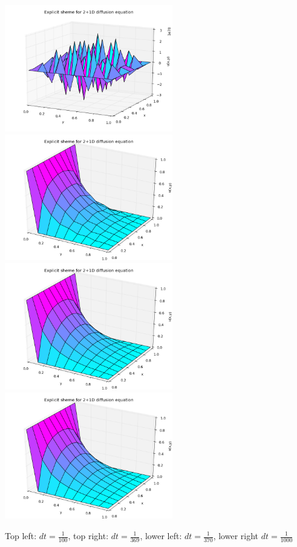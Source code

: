 \documentclass[a4paper, 12pt, titlepage]{article}
\newcommand{\f}[2]{\frac{#1}{#2}}
\begin{document}
\begin{section}
\begin{subsection}
    \includegraphics[width=0.55\textwidth]{build-main-Desktop-Debug/Explicit100.png}
    \includegraphics[width=0.55\textwidth]{build-main-Desktop-Debug/Explicit369.png}
    \includegraphics[width=0.55\textwidth]{build-main-Desktop-Debug/Explicit370.png}
    \includegraphics[width=0.55\textwidth]{build-main-Desktop-Debug/Explicit1000.png}
    
    Top left: $dt = \f{1}{100}$, top right: $dt = \f{1}{369}$, lower left: $dt = \f{1}{370}$,
    lower right $dt = \f{1}{1000}$
    

\end{subsection}
\end{section}
\end{document}
